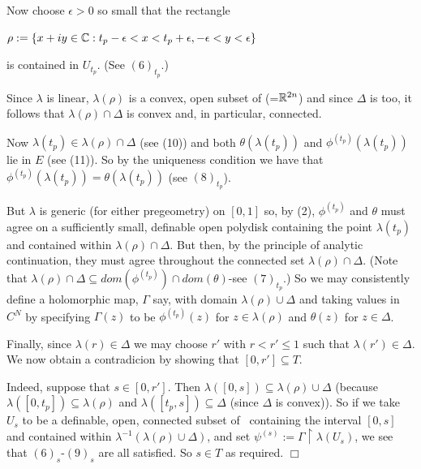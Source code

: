 \documentclass[12pt,nodate]{article}
\begin{document}
 \vspace{3mm}
 
 Now choose $\epsilon > 0$ so small that the rectangle
 
 \vspace{3mm}
 
 \hspace{20mm} $\rho := \{ x + iy \in \mathbb{C} : t_p -\epsilon < x < t_p + \epsilon , -\epsilon < y < \epsilon \}$
 
 \vspace{2mm}
 
 \noindent
 is  contained in $U_{t_p}$. (See $(6)_{t_p}$.)
 
 \vspace{2mm}
 
 Since $\lambda$ is linear, $\lambda (\rho )$ is a convex, open subset of \Cn  (=$\mathbb{R}^{2n}$) and since $\Delta$ is too, it follows that $\lambda (\rho ) \cap \Delta$ is convex and, in particular, connected.
 
 Now $\lambda (t_p ) \in \lambda (\rho ) \cap \Delta$ (see (10)) and both $\theta (\lambda (t_p ))$ and $\phi^{(t_p )} (\lambda (t_p ))$ lie in $E$ (see (11)). So by the uniqueness condition we have that $\phi^{(t_p )} (\lambda (t_p )) = \theta (\lambda (t_p 
 ))$ (see $(8)_{t_p}$). 
 
 But $\lambda$ is generic (for either pregeometry) on $[0, 1]$ so, by (2), $\phi^{(t_p )}$ and $\theta$ must agree on a sufficiently small, definable open polydisk containing the point $\lambda (t_p )$ and contained within $\lambda (\rho ) \cap \Delta$. But then, by the principle of analytic continuation, they must agree throughout the connected set 
 $\lambda (\rho ) \cap \Delta$. (Note that $\lambda (\rho ) \cap \Delta \subseteq dom(\phi ^{(t_p)}) \cap dom (\theta )$-see $(7)_{t_p}$.)
 So we may consistently define a holomorphic map, $\Gamma$ say,  with domain 
  $\lambda (\rho ) \cup \Delta$ and taking values in $C^N$ by specifying $\Gamma (z)$ to be $\phi^{(t_p )} (z)$ for $z \in \lambda (\rho )$ and $\theta (z)$ for $z \in \Delta$.
  
  Finally, since $\lambda (r) \in \Delta$ we may choose $r'$ with $r < r' \leq 1$ such that $\lambda (r') \in \Delta$. We now obtain a contradicion by showing that $[0, r'] \subseteq T$. 
  
  Indeed, suppose that $s \in [0, r']$. Then $\lambda ([0, s]) \subseteq \lambda (\rho ) \cup \Delta$ (because $\lambda ([0, t_p ]) \subseteq \lambda (\rho )$ and $\lambda ([t_p ,s]) \subseteq \Delta$ (since $\Delta$ is convex)). So if we take $U_s$ to be a definable, open, connected subset of \C\  containing the interval $[0, s]$ and contained within $\lambda^{-1} (\lambda (\rho ) \cup \Delta )$, and set $\psi^{(s)} := \Gamma \upharpoonright \lambda (U_s )$, we see that $(6)_s$-$(9)_s$ are all satisfied. So $s \in T$ as required. $\Box$ 
 
\end{document}
